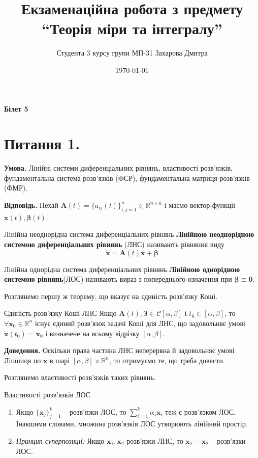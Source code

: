 \documentclass[14pt]{extarticle}
\title{Екзаменаційна робота з предмету ``Теорія міри та інтегралу''}
\author{Студента 3 курсу групи МП-31 Захарова Дмитра}
\date{\today}
\begin{document}
\maketitle

\begin{center}
    \textbf{Білет 5}
\end{center}

\section*{Питання 1.}

\textbf{Умова.} Лінійні системи диференціальних рівнянь, властивості розв’язків, фундаментальна система розв’язків (ФСР), фундаментальна матриця розв’язків (ФМР).

\textbf{Відповідь.} Нехай $\mathbf{A}(t) = \{a_{ij}(t)\}_{i,j=1}^n \in \mathbb{R}^{n \times n}$ і маємо вектор-функції $\mathbf{x}(t),\boldsymbol{\beta}(t)$. 

\begin{def*}{Лінійна неоднорідна система диференціальних рівнянь}
    \textbf{Лінійною неоднорідною системою диференціальних рівнянь} (ЛНС) називають рівняння виду
    \[
    \dot{\mathbf{x}} = \mathbf{A}(t)\mathbf{x} + \boldsymbol{\beta}
    \]
\end{def*}
\begin{def*}{Лінійна однорідна система диференціальних рівнянь}
    \textbf{Лінійною однорідною системою рівнянь}(ЛОС) називають вираз з попереднього означення при $\boldsymbol{\beta} \equiv \mathbf{0}$. 
\end{def*}

Розглянемо першу ж теорему, що вказує на єдиність розв'язку Коші.

\begin{theorem*}{Єдиність розв'язку Коші ЛНС}
    Якщо $\mathbf{A}(t),\boldsymbol{\beta} \in \mathcal{C}[\alpha,\beta]$ і $t_0 \in [\alpha,\beta]$, то $\forall \mathbf{x}_0 \in \mathbb{R}^n$ існує єдиний розв'язок задачі Коші для ЛНС, що задовольняє умові $\dot{\mathbf{x}}(t_0)=\mathbf{x}_0$ і визначене на всьому відрізку $[\alpha,\beta]$.
\end{theorem*}

\textbf{Доведення.} Оскільки права частина ЛНС неперервна й задовольняє умові Ліпшиця по $\mathbf{x}$ в шарі $[\alpha,\beta] \times \mathbb{R}^n$, то отримуємо те, що треба довести.

Розглянемо властивості розв'язків таких рівнянь.

\begin{statement*}{Властивості розв'язків ЛОС}
    \begin{enumerate}
        \item Якщо $\{\mathbf{x}_j\}_{j=1}^k$ -- розв'язки ЛОС, то $\sum_{i=1}^k \alpha_i\mathbf{x}_i$ теж є розв'язком ЛОС. Інакшими словами, множина розв'язків ЛОС утворюють лінійний простір. 
        \item \textit{Принцип суперпозиції:} Якщо $\mathbf{x}_1,\mathbf{x}_2$ розв'язки ЛНС, то $\mathbf{x}_1-\mathbf{x}_2$ -- розв'язки ЛОС. 
    \end{enumerate}
\end{statement*}
\end{document}
